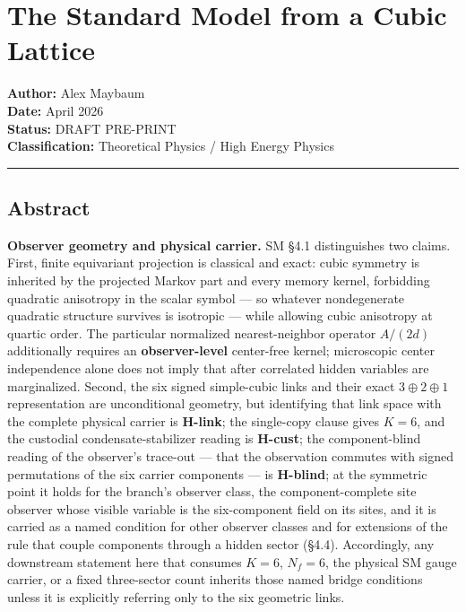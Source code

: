 \documentclass[
]{article}
\author{}
\date{}
\begin{document}
\hypertarget{the-standard-model-from-a-cubic-lattice}{%
\section{The Standard Model from a Cubic
Lattice}\label{the-standard-model-from-a-cubic-lattice}}

\textbf{Author:} Alex Maybaum\\
\textbf{Date:} April 2026\\
\textbf{Status:} DRAFT PRE-PRINT\\
\textbf{Classification:} Theoretical Physics / High Energy Physics

\begin{center}\rule{0.5\linewidth}{0.5pt}\end{center}

\hypertarget{abstract}{%
\subsection{Abstract}\label{abstract}}

\textbf{Observer geometry and physical carrier.} SM §4.1 distinguishes
two claims. First, finite equivariant projection is classical and exact:
cubic symmetry is inherited by the projected Markov part and every
memory kernel, forbidding quadratic anisotropy in the scalar symbol ---
so whatever nondegenerate quadratic structure survives is isotropic ---
while allowing cubic anisotropy at quartic order. The particular
normalized nearest-neighbor operator \(A/(2d)\) additionally requires an
\textbf{observer-level} center-free kernel; microscopic center
independence alone does not imply that after correlated hidden variables
are marginalized. Second, the six signed simple-cubic links and their
exact \(3\oplus2\oplus1\) representation are unconditional geometry, but
identifying that link space with the complete physical carrier is
\textbf{H-link}; the single-copy clause gives \(K=6\), and the custodial
condensate-stabilizer reading is \textbf{H-cust}; the component-blind
reading of the observer's trace-out --- that the observation commutes
with signed permutations of the six carrier components --- is
\textbf{H-blind}; at the symmetric point it holds for the branch's
observer class, the component-complete site observer whose visible
variable is the six-component field on its sites, and it is carried as a
named condition for other observer classes and for extensions of the
rule that couple components through a hidden sector (§4.4). Accordingly,
any downstream statement here that consumes \(K=6\), \(N_f=6\), the
physical SM gauge carrier, or a fixed three-sector count inherits those
named bridge conditions unless it is explicitly referring only to the
six geometric links.
\end{document}
